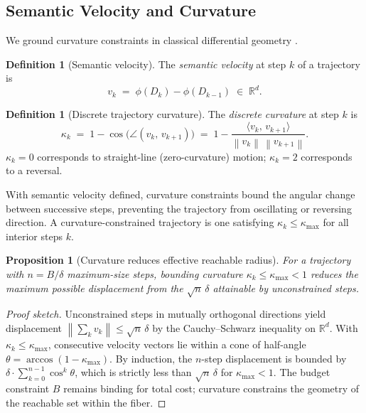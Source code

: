 \documentclass[12pt, a4paper]{article}
\theoremstyle{plain}
\newtheorem{proposition}[theorem]{Proposition}
\theoremstyle{definition}
\newtheorem{definition}[theorem]{Definition}
\theoremstyle{remark}
\newcommand{\bR}{\mathbb{R}}
\newcommand{\norm}[1]{\left\lVert #1 \right\rVert}
\newcommand{\inner}[2]{\langle #1,\, #2 \rangle}
\begin{document}
\subsection{Semantic Velocity and Curvature}

We ground curvature constraints in classical differential geometry
\cite{docarmo1992riemannian}.

\begin{definition}[Semantic velocity]
\label{def:velocity}
The \emph{semantic velocity} at step $k$ of a trajectory is
\[
   v_k \;=\; \phi(D_k) - \phi(D_{k-1}) \;\in\; \bR^d.
\]
\end{definition}

\begin{definition}[Discrete trajectory curvature]
\label{def:curvature}
The \emph{discrete curvature} at step $k$ is
\[
   \kappa_k \;=\; 1 - \cos\bigl(\angle(v_k,\, v_{k+1})\bigr)
             \;=\; 1 - \frac{\inner{v_k}{v_{k+1}}}{\norm{v_k}\,\norm{v_{k+1}}}.
\]
$\kappa_k = 0$ corresponds to straight-line (zero-curvature) motion; $\kappa_k
= 2$ corresponds to a reversal.
\end{definition}

With semantic velocity defined, curvature constraints bound the angular change
between successive steps, preventing the trajectory from oscillating or
reversing direction.  A curvature-constrained trajectory is one satisfying
$\kappa_k \le \kappa_{\max}$ for all interior steps $k$.

\begin{proposition}[Curvature reduces effective reachable radius]
\label{prop:curvature}
For a trajectory with $n = B/\delta$ maximum-size steps, bounding curvature
$\kappa_k \le \kappa_{\max} < 1$ reduces the maximum possible displacement
from the $\sqrt{n}\,\delta$ attainable by unconstrained steps.
\end{proposition}

\begin{proof}[Proof sketch]
Unconstrained steps in mutually orthogonal directions yield displacement
$\norm{\sum_k v_k} \le \sqrt{n}\,\delta$ by the Cauchy--Schwarz inequality on
$\bR^d$.  With $\kappa_k \le \kappa_{\max}$, consecutive velocity vectors lie
within a cone of half-angle $\theta = \arccos(1 - \kappa_{\max})$.  By
induction, the $n$-step displacement is bounded by
$\delta \cdot \sum_{k=0}^{n-1} \cos^k\!\theta$, which is strictly less than
$\sqrt{n}\,\delta$ for $\kappa_{\max} < 1$.  The budget constraint $B$ remains
binding for total cost; curvature constrains the geometry of the reachable set
within the fiber.
\end{proof}
\end{document}
